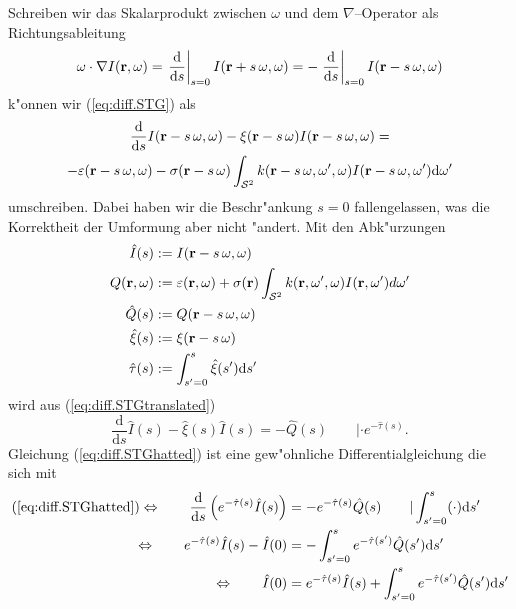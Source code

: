 	Schreiben wir das Skalarprodukt zwischen $\omega$ und dem $\nabla$--Operator als Richtungsableitung
	\newcommand{\dds}{\frac{\text{d}}{\text{d}s}}
	\newcommand{\ddszero}{\left. \dds \right|_{s=0}}
	\begin{equation*}
		\omega \cdot \nabla I(\location{r},\omega)
		=  \ddszero I(\location{r}+s\,\omega,\omega)
		=  -\ddszero I(\location{r}-s\,\omega,\omega)
	\end{equation*}
	k"onnen wir (\ref{eq:diff.STG}) als
	\begin{multline}
		\dds I(\location{r}-s\,\omega,\omega) - \xi(\location{r}-s\,\omega)I(\location{r}-s\,\omega,\omega) = \\-\varepsilon(\location{r}-s\,\omega,\omega) -\sigma(\location{r}-s\,\omega) \int_{\mathcal{S}^2} k(\location{r}-s\,\omega,\omega',\omega)I(\location{r}-s\,\omega,\omega') \text{d}\omega'
		\label{eq:diff.STGtranslated}
	\end{multline}
	umschreiben. Dabei haben wir die Beschr"ankung $s=0$ fallengelassen, was die Korrektheit der Umformung aber nicht "andert. Mit den Abk"urzungen
	\begin{align*}
		{\hat I}(s)&:=I(\mathbf{r}-s\,\omega,\omega) \\
		Q(\mathbf{r},\omega)&:= \varepsilon(\mathbf{r},\omega)+\sigma(\mathbf{r}) \int_{\mathcal{S}^2} k(\mathbf{r},\omega',\omega)I(\mathbf{r},\omega') d\omega' \\
		{\hat Q}(s)&:=Q(\mathbf{r}-s\,\omega,\omega)\\
		{\hat \xi}(s)&:=\xi(\mathbf{r}-s\,\omega) \\
		{\hat \tau}(s)&:= \int_{s'=0}^{s} {\hat \xi}(s') \text{d}s'
	\end{align*}
	wird aus (\ref{eq:diff.STGtranslated})
	\begin{equation}
		\dds {\hat I}(s) - {\hat \xi}(s){\hat I}(s)= -{\hat Q}(s) \qquad |\cdot e^{-{\hat \tau}(s)}.
		\label{eq:diff.STGhatted}
	\end{equation}
	Gleichung (\ref{eq:diff.STGhatted}) ist eine gew"ohnliche Differentialgleichung die sich mit
	\begin{align}
		(\ref{eq:diff.STGhatted})\Leftrightarrow\qquad \dds \left(e^{-{\hat \tau}(s)} {\hat I}(s)\right)&= -e^{-{\hat \tau}(s)} {\hat Q}(s) \qquad | \int_{s'=0}^s (\cdot)\text{d}s' \nonumber \\
		\Leftrightarrow\qquad e^{-{\hat \tau}(s)} {\hat I}(s) - {\hat I}(0) &= -\int_{s'=0}^s e^{-{\hat \tau}(s')} {\hat Q}(s') \text{d}s' \nonumber \\
		\Leftrightarrow\qquad {\hat I}(0) &= e^{-{\hat \tau}(s)} {\hat I}(s) + \int_{s'=0}^s e^{-{\hat \tau}(s')} {\hat Q}(s') \text{d}s' \label{eq:diff.STGpreintegral}
	\end{align}
